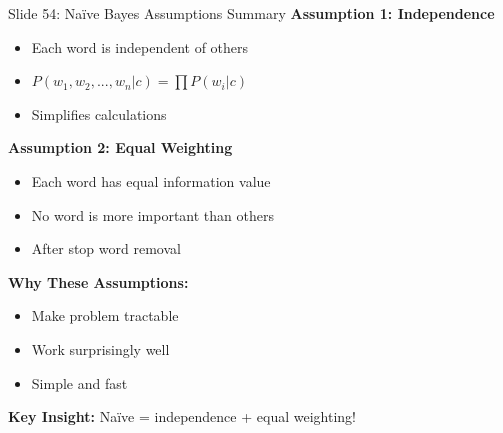\documentclass[8pt]{beamer}
\begin{document}
	\begin{frame}{Slide 54: Naïve Bayes Assumptions Summary}
		\fontsize{6.5}{7.5}\selectfont
		\textbf{Assumption 1: Independence}
		\begin{itemize}
			\item Each word is independent of others
			\item $P(w_1, w_2, ..., w_n|c) = \prod P(w_i|c)$
			\item Simplifies calculations
		\end{itemize}
		
		\vspace{0.1cm}
		\textbf{Assumption 2: Equal Weighting}
		\begin{itemize}
			\item Each word has equal information value
			\item No word is more important than others
			\item After stop word removal
		\end{itemize}
		
		\vspace{0.1cm}
		\textbf{Why These Assumptions:}
		\begin{itemize}
			\item Make problem tractable
			\item Work surprisingly well
			\item Simple and fast
		\end{itemize}
		
		\textcolor{myblue}{\textbf{Key Insight:}} Naïve = independence + equal weighting!
	\end{frame}
	
\end{document}
